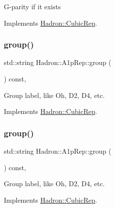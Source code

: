 G-\/parity if it exists 

Implements \mbox{\hyperlink{structHadron_1_1CubicRep_a52104e43266d1614c00bbd1c3b395458}{Hadron\+::\+Cubic\+Rep}}.

\mbox{\label{structHadron_1_1A1pRep_ae6ce3057cbe0aae60a3816c69f3a6dd9}} 
\subsubsection{\texorpdfstring{group()}{group()}\hspace{0.1cm}{\footnotesize\ttfamily [1/2]}}
{\footnotesize\ttfamily std\+::string Hadron\+::\+A1p\+Rep\+::group (\begin{DoxyParamCaption}{ }\end{DoxyParamCaption}) const\hspace{0.3cm}{\ttfamily [inline]}, {\ttfamily [virtual]}}

Group label, like Oh, D2, D4, etc. 

Implements \mbox{\hyperlink{structHadron_1_1CubicRep_a0748f11ec87f387062c8e8981339a29c}{Hadron\+::\+Cubic\+Rep}}.

\mbox{\label{structHadron_1_1A1pRep_ae6ce3057cbe0aae60a3816c69f3a6dd9}} 
\subsubsection{\texorpdfstring{group()}{group()}\hspace{0.1cm}{\footnotesize\ttfamily [2/2]}}
{\footnotesize\ttfamily std\+::string Hadron\+::\+A1p\+Rep\+::group (\begin{DoxyParamCaption}{ }\end{DoxyParamCaption}) const\hspace{0.3cm}{\ttfamily [inline]}, {\ttfamily [virtual]}}

Group label, like Oh, D2, D4, etc. 

Implements \mbox{\hyperlink{structHadron_1_1CubicRep_a0748f11ec87f387062c8e8981339a29c}{Hadron\+::\+Cubic\+Rep}}.

\mbox{\label{structHadron_1_1A1pRep_a675f4c667a7e5d059a65b5ddad0321f3}} 
